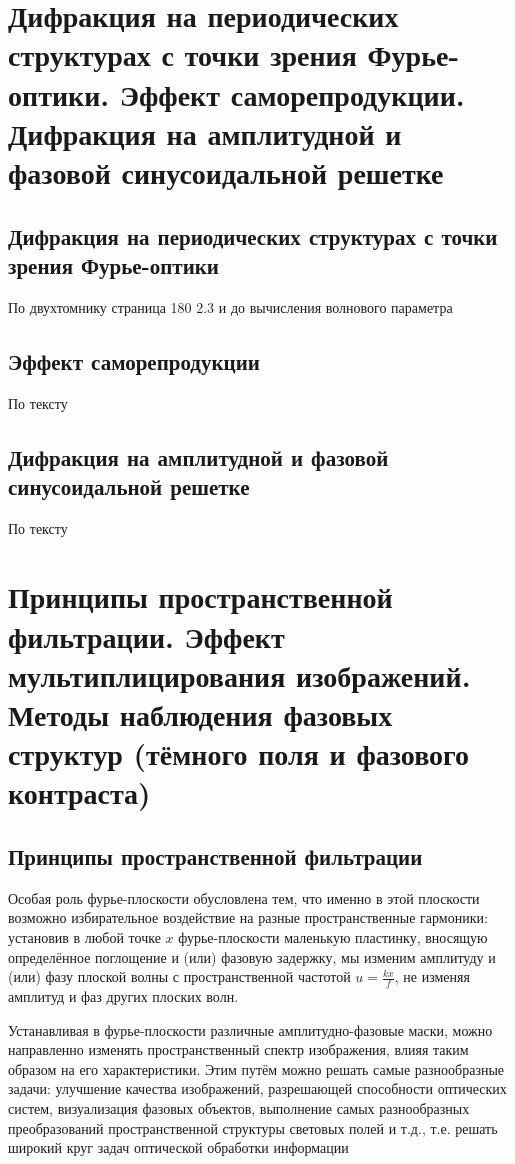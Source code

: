 \documentclass[a4paper, 14pt]{article}
\begin{document}
    \section{Дифракция на периодических структурах с точки зрения Фурье-оптики.
    Эффект саморепродукции.
    Дифракция на амплитудной и фазовой синусоидальной решетке}
    
    \subsection{Дифракция на периодических структурах с точки зрения Фурье-оптики}
    
    По двухтомнику страница 180 2.3 и до вычисления волнового параметра
    
    \subsection{Эффект саморепродукции}
    
    По тексту
    
    \subsection{Дифракция на амплитудной и фазовой синусоидальной решетке}
    
    По тексту
    
    \section{Принципы пространственной фильтрации.
    Эффект мультиплицирования изображений.
    Методы наблюдения фазовых структур (тёмного поля и фазового контраста)}
    
    \subsection{Принципы пространственной фильтрации}
    
    Особая роль фурье-плоскости обусловлена тем, что именно в этой плоскости возможно избирательное воздействие на
    разные пространственные гармоники: установив в любой точке $x$ фурье-плоскости маленькую пластинку, вносящую
    определённое поглощение и (или) фазовую задержку, мы изменим амплитуду и (или) фазу плоской волны с
    пространственной частотой $u = \frac{kx}{f}$, не изменяя амплитуд и фаз других плоских волн.
    
    Устанавливая в фурье-плоскости различные амплитудно-фазовые маски, можно направленно изменять пространственный
    спектр изображения, влияя таким образом на его характеристики.
    Этим путём можно решать самые разнообразные задачи: улучшение качества изображений, разрешающей способности оптических
    систем, визуализация фазовых объектов, выполнение самых разнообразных преобразований пространственной структуры
    световых полей и т.д., т.е. решать широкий круг задач оптической обработки информации
    
\end{document}
